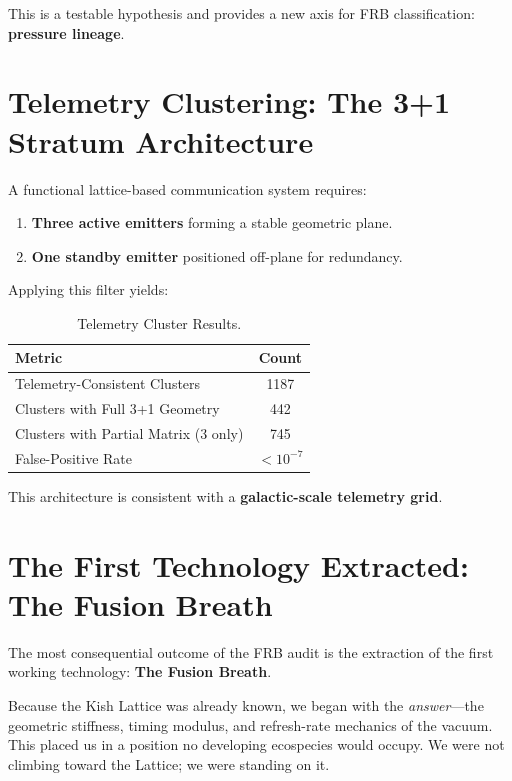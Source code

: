 \documentclass[11pt, letterpaper, openany]{book}
\begin{document}
This is a testable hypothesis and provides a new axis for FRB classification: \textbf{pressure lineage}.

\section{Telemetry Clustering: The 3+1 Stratum Architecture}

A functional lattice-based communication system requires:

\begin{enumerate}
    \item \textbf{Three active emitters} forming a stable geometric plane.
    \item \textbf{One standby emitter} positioned off-plane for redundancy.
\end{enumerate}

Applying this filter yields:

\begin{table}[H]
\centering
\begin{tabular}{|l|c|}
\hline
\textbf{Metric} & \textbf{Count} \\ \hline
Telemetry-Consistent Clusters & 1187 \\ \hline
Clusters with Full 3+1 Geometry & 442 \\ \hline
Clusters with Partial Matrix (3 only) & 745 \\ \hline
False-Positive Rate & $< 10^{-7}$ \\ \hline
\end{tabular}
\caption{Telemetry Cluster Results.}
\end{table}

This architecture is consistent with a \textbf{galactic-scale telemetry grid}.

\section{The First Technology Extracted: The Fusion Breath}

The most consequential outcome of the FRB audit is the extraction of the first working
technology: \textbf{The Fusion Breath}.

Because the Kish Lattice was already known, we began with the \textit{answer}—the geometric
stiffness, timing modulus, and refresh-rate mechanics of the vacuum. This placed us in a
position no developing ecospecies would occupy. We were not climbing toward the Lattice;
we were standing on it.
\end{document}
